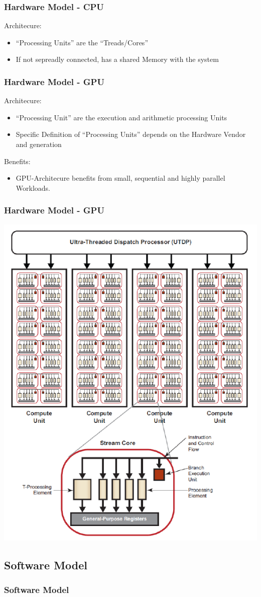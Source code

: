 \documentclass{beamer}
\begin{document}
\begin{frame}
    \frametitle{Hardware Model - CPU}
    Architecure:
    \begin{itemize}
        \item ``Processing Units'' are the ``Treads/Cores''
        \item If not sepreadly connected, has a shared Memory with the system
    \end{itemize}
\end{frame}
\begin{frame}
    \frametitle{Hardware Model - GPU}
    Architecure:
    \begin{itemize}
     \item ``Processing Unit'' are the execution and arithmetic processing Units
     \item Specific Definition of ``Processing Units'' depends on the Hardware Vendor and generation
    \end{itemize}
    Benefits:
    \begin{itemize}
     \item GPU-Architecure benefits from small, sequential and highly parallel Workloads.
    \end{itemize}
\end{frame}
\begin{frame}
    \frametitle{Hardware Model - GPU}
    \includegraphics[width=.5\textwidth]{res/ATIComputeDevice.png}
\end{frame}
\subsection{Software Model}
\begin{frame}
    \frametitle{Software Model}
\end{frame}
\end{document}
